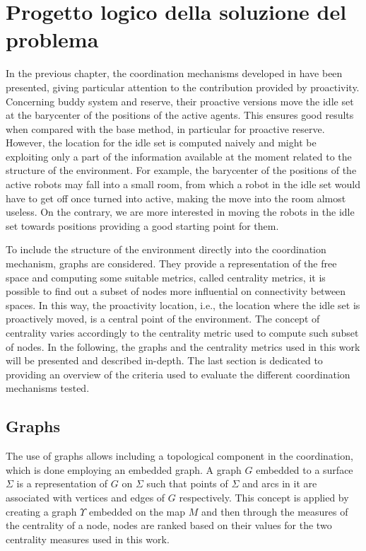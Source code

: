 \chapter{Progetto logico della soluzione del problema}
\label{capitolo4}
\thispagestyle{empty}

In the previous chapter, the coordination mechanisms developed in
\cite{Cattaneo2017} have been presented, giving particular attention
to the contribution provided by proactivity. Concerning buddy system
and reserve, their proactive versions move the idle set at the barycenter
of the positions of the active agents. This ensures good results when
compared with the base method, in particular for proactive reserve.
However, the location for the idle set is computed naively and might
be exploiting only a part of the information available at the moment
related to the structure of the environment. For example, the barycenter
of the positions of the active robots may fall into a small room,
from which a robot in the idle set would have to get off once turned
into active, making the move into the room almost useless. On the
contrary, we are more interested in moving the robots in the idle
set towards positions providing a good starting point for them. 

To include the structure of the environment directly into the coordination
mechanism, graphs are considered. They provide a representation of
the free space and computing some suitable metrics, called centrality
metrics, it is possible to find out a subset of nodes more influential
on connectivity between spaces. In this way, the proactivity location,
i.e., the location where the idle set is proactively moved, is a central
point of the environment. The concept of centrality varies accordingly
to the centrality metric used to compute such subset of nodes. In
the following, the graphs and the centrality metrics used in this
work will be presented and described in-depth. The last section is
dedicated to providing an overview of the criteria used to evaluate
the different coordination mechanisms tested.

\section{Graphs}

The use of graphs allows including a topological component in the
coordination, which is done employing an embedded graph. A graph $G$
embedded to a surface $\Sigma$ is a representation of $G$ on $\Sigma$
such that points of $\Sigma$ and arcs in it are associated with vertices
and edges of $G$ respectively. This concept is applied by creating
a graph $\varUpsilon$ embedded on the map $M$ and then through the
measures of the centrality of a node, nodes are ranked based on their
values for the two centrality measures used in this work.

